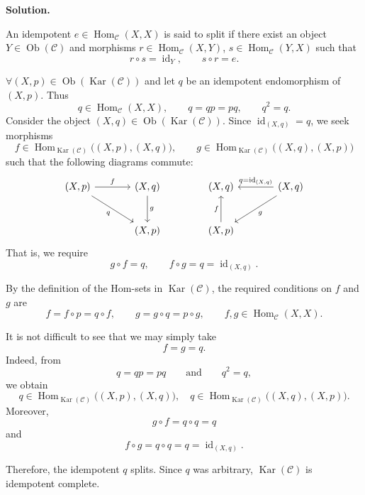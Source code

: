 \documentclass[11pt,a4paper]{article}
\newcounter{problem}
\newcounter{saveequation}
\newenvironment{solution}
{
	\par
	\setcounter{saveequation}{\value{equation}}
	\begingroup
	\setcounter{equation}{0}
	\renewcommand{\theequation}{\arabic{problem}.\arabic{equation}}
	\renewcommand{\theHequation}{sol.\arabic{problem}.\arabic{equation}}
	\noindent\textbf{Solution.}\quad
}
{
	\par
	\endgroup
	\setcounter{equation}{\value{saveequation}}
}
\begin{document}
	\begin{solution}
		An idempotent $e\in\operatorname{Hom}_{\mathcal C}(X,X)$
		is said to split if there exist an object \(Y\in\operatorname{Ob}(\mathcal C)\) and morphisms $r\in\operatorname{Hom}_{\mathcal C}(X,Y)$, $s\in\operatorname{Hom}_{\mathcal C}(Y,X)$
		such that
		\[
		r\circ s=\operatorname{id}_Y,
		\qquad
		s\circ r=e.
		\]
		
		$\forall (X,p)\in\operatorname{Ob}(\operatorname{Kar}(\mathcal C))$ and let \(q\) be an idempotent endomorphism of \((X,p)\). Thus
		\[
		q\in\operatorname{Hom}_{\mathcal C}(X,X),
		\qquad
		q=qp=pq,
		\qquad
		q^2=q.
		\]
		Consider the object $
		(X,q)\in\operatorname{Ob}(\operatorname{Kar}(\mathcal C))$. Since $
		\operatorname{id}_{(X,q)}=q$, we seek morphisms
		\[
		f\in
		\operatorname{Hom}_{\operatorname{Kar}(\mathcal C)}
		\bigl((X,p),(X,q)\bigr),
		\qquad
		g\in
		\operatorname{Hom}_{\operatorname{Kar}(\mathcal C)}
		\bigl((X,q),(X,p)\bigr)
		\]
		such that the following diagrams commute:
		\[
		\begin{tikzcd}[column sep=large,row sep=large]
			(X,p)
			\arrow[r,"f"]
			\arrow[dr,"q"']
			&
			(X,q)
			\arrow[d,"g"]
			\\
			&
			(X,p)
		\end{tikzcd}
		\qquad\qquad
		\begin{tikzcd}[column sep=large,row sep=large]
			(X,q)
			&
			(X,q)
			\arrow[l,"q=\operatorname{id}_{(X,q)}"']
			\arrow[dl,"g"]
			\\
			(X,p)
			\arrow[u,"f"]
			&
		\end{tikzcd}
		\]
		That is, we require
		\[
		g\circ f=q,
		\qquad
		f\circ g=q=\operatorname{id}_{(X,q)}.
		\]
		
		By the definition of the Hom-sets in
		\(\operatorname{Kar}(\mathcal C)\), the required conditions on \(f\) and \(g\) are
		\[
		f=f\circ p=q\circ f,
		\qquad
		g=g\circ q=p\circ g,
		\qquad
		f,g\in\operatorname{Hom}_{\mathcal C}(X,X).
		\]
		
		It is not difficult to see that we may simply take
		\[
		f=g=q.
		\]
		Indeed, from
		\[
		q=qp=pq
		\qquad\text{and}\qquad
		q^2=q,
		\]
		we obtain
		\[
		q\in
		\operatorname{Hom}_{\operatorname{Kar}(\mathcal C)}
		\bigl((X,p),(X,q)\bigr),\quad
		q\in
		\operatorname{Hom}_{\operatorname{Kar}(\mathcal C)}
		\bigl((X,q),(X,p)\bigr).
		\]
		Moreover,
		\[
		g\circ f=q\circ q=q
		\]
		and
		\[
		f\circ g=q\circ q=q
		=
		\operatorname{id}_{(X,q)}.
		\]
		
		Therefore, the idempotent \(q\) splits. Since \(q\) was arbitrary, $\operatorname{Kar}(\mathcal C)$ is idempotent complete.
	\end{solution}
\end{document}
